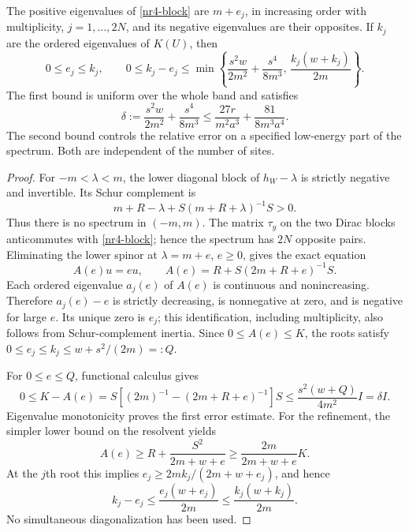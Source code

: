 \begin{theorem}
\label{nr4-static-theorem}
The positive eigenvalues of \eqref{nr4-block} are $m+e_j$, in increasing
order with multiplicity, $j=1,\ldots,2N$, and its negative eigenvalues
are their opposites. If $k_j$ are the ordered eigenvalues of $K(U)$, then
\begin{equation}
 0\le e_j\le k_j,\qquad
 0\le k_j-e_j\le
 \min\left\{\frac{s^2w}{2m^2}+\frac{s^4}{8m^3},\,
                   \frac{k_j(w+k_j)}{2m}\right\}.
 \label{nr4-static-error}
\end{equation}
The first bound is uniform over the whole band and satisfies
\begin{equation}
 \delta:=\frac{s^2w}{2m^2}+\frac{s^4}{8m^3}
 \le\frac{27r}{m^2a^3}+\frac{81}{8m^3a^4}.
 \label{nr4-delta}
\end{equation}
The second bound controls the relative error on a specified low-energy
part of the spectrum. Both are independent of the number of sites.
\end{theorem}
\begin{proof}
For $-m<\lambda<m$, the lower diagonal block of $h_W-\lambda$ is
strictly negative and invertible. Its Schur complement is
\[
 m+R-\lambda+S(m+R+\lambda)^{-1}S>0.
\]
Thus there is no spectrum in $(-m,m)$. The matrix $\tau_y$ on the two
Dirac blocks anticommutes with \eqref{nr4-block}; hence the spectrum
has $2N$ opposite pairs. Eliminating the lower spinor at
$\lambda=m+e$, $e\ge0$, gives the exact equation
\begin{equation}
 A(e)u=eu,\qquad A(e)=R+S(2m+R+e)^{-1}S.
 \label{nr4-schur}
\end{equation}
Each ordered eigenvalue $a_j(e)$ of $A(e)$ is continuous and
nonincreasing. Therefore $a_j(e)-e$ is strictly decreasing, is
nonnegative at zero, and is negative for large $e$. Its unique zero
is $e_j$; this identification, including multiplicity, also follows
from Schur-complement inertia. Since $0\le A(e)\le K$, the roots
satisfy $0\le e_j\le k_j\le w+s^2/(2m)=:Q$.

For $0\le e\le Q$, functional calculus gives
\[
 0\le K-A(e)
 =S\left[(2m)^{-1}-(2m+R+e)^{-1}\right]S
 \le\frac{s^2(w+Q)}{4m^2}I=\delta I.
\]
Eigenvalue monotonicity proves the first error estimate. For the
refinement, the simpler lower bound on the resolvent yields
\[
 A(e)\ge R+\frac{S^2}{2m+w+e}
 \ge\frac{2m}{2m+w+e}K.
\]
At the $j$th root this implies
$e_j\ge2mk_j/(2m+w+e_j)$, and hence
\[
 k_j-e_j\le\frac{e_j(w+e_j)}{2m}
             \le\frac{k_j(w+k_j)}{2m}.
\]
No simultaneous diagonalization has been used.
\end{proof}

